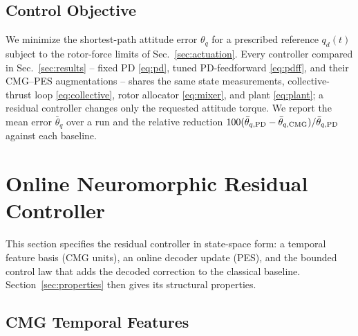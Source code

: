 \documentclass[letterpaper, 10 pt, conference]{ieeeconf}
\begin{document}
\subsection{Control Objective}
We minimize the shortest-path attitude error $\theta_q$ for a prescribed
reference $q_d(t)$ subject to the rotor-force limits of
Sec.~\ref{sec:actuation}. Every controller compared in Sec.~\ref{sec:results}
-- fixed PD \eqref{eq:pd}, tuned PD-feedforward \eqref{eq:pdff}, and their
CMG--PES augmentations -- shares the same state measurements,
collective-thrust loop \eqref{eq:collective}, rotor allocator
\eqref{eq:mixer}, and plant \eqref{eq:plant}; a residual controller changes
only the requested attitude torque. We report the mean error $\bar\theta_q$
over a run and the relative reduction
$100(\bar\theta_{q,\rm PD}-\bar\theta_{q,\rm CMG})/\bar\theta_{q,\rm PD}$
against each baseline.

\section{Online Neuromorphic Residual Controller}
\label{sec:architecture}
This section specifies the residual controller in state-space form: a
temporal feature basis (CMG units), an online decoder update (PES), and the
bounded control law that adds the decoded correction to the classical
baseline. Section~\ref{sec:properties} then gives its structural properties.

\subsection{CMG Temporal Features}
\end{document}
